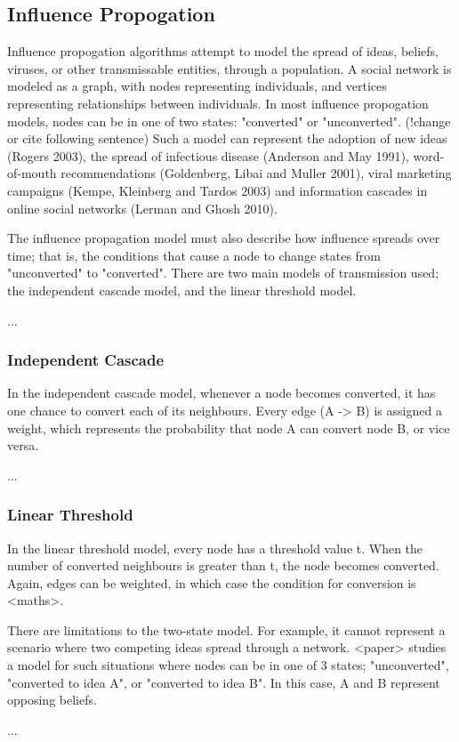 \subsection{Influence Propogation}

 Influence propogation algorithms attempt to model the spread of ideas, beliefs, viruses, or other transmissable entities, through a population. A social network is modeled as a graph, with nodes representing individuals, and vertices representing relationships between individuals. In most influence propogation models, nodes can be in one of two states: "converted" or "unconverted". (!change or cite following sentence) Such a model can represent the adoption of new ideas (Rogers 2003), the spread of infectious disease (Anderson and May 1991), word-of-mouth recommendations (Goldenberg, Libai and Muller 2001), viral marketing campaigns (Kempe, Kleinberg and Tardos 2003) and information cascades in online social networks (Lerman and Ghosh 2010).

 The influence propagation model must also describe how influence spreads over time; that is, the conditions that cause a node to change states from "unconverted" to "converted". There are two main models of transmission used; the independent cascade model, and the linear threshold model.

...

\subsubsection{Independent Cascade}
 In the independent cascade model, whenever a node becomes converted, it has one chance to convert each of its neighbours. Every edge (A -> B) is assigned a weight, which represents the probability that node A can convert node B, or vice versa.

...

\subsubsection{Linear Threshold}
 In the linear threshold model, every node has a threshold value t. When the number of converted neighbours is greater than t, the node becomes converted. Again, edges can be weighted, in which case the condition for conversion is <maths>.

 There are limitations to the two-state model. For example, it cannot represent a scenario where two competing ideas spread through a network. <paper> studies a model for such situations where nodes can be in one of 3 states; "unconverted", "converted to idea A", or "converted to idea B". In this case, A and B represent opposing beliefs.

...
